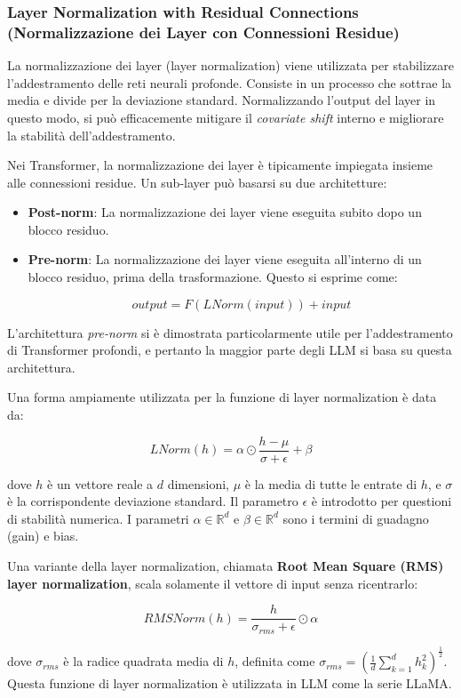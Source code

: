 \subsubsection{Layer Normalization with Residual Connections (Normalizzazione dei Layer con Connessioni Residue)}
La normalizzazione dei layer (layer normalization) viene utilizzata per stabilizzare l'addestramento delle reti neurali profonde. Consiste in un processo che sottrae la media e divide per la deviazione standard. Normalizzando l'output del layer in questo modo, si può efficacemente mitigare il \textit{covariate shift} interno e migliorare la stabilità dell'addestramento.

Nei Transformer, la normalizzazione dei layer è tipicamente impiegata insieme alle connessioni residue. Un sub-layer può basarsi su due architetture:
\begin{itemize}
\item \textbf{Post-norm}: La normalizzazione dei layer viene eseguita subito dopo un blocco residuo.
\item \textbf{Pre-norm}: La normalizzazione dei layer viene eseguita all'interno di un blocco residuo, prima della trasformazione. Questo si esprime come:


$$output = F(LNorm(input)) + input$$


\end{itemize}
L'architettura \textit{pre-norm} si è dimostrata particolarmente utile per l'addestramento di Transformer profondi, e pertanto la maggior parte degli LLM si basa su questa architettura.

Una forma ampiamente utilizzata per la funzione di layer normalization è data da:


$$LNorm(h) = \alpha \odot \frac{h - \mu}{\sigma + \epsilon} + \beta$$


dove $h$ è un vettore reale a $d$ dimensioni, $\mu$ è la media di tutte le entrate di $h$, e $\sigma$ è la corrispondente deviazione standard. Il parametro $\epsilon$ è introdotto per questioni di stabilità numerica. I parametri $\alpha \in \mathbb{R}^d$ e $\beta \in \mathbb{R}^d$ sono i termini di guadagno (gain) e bias.

Una variante della layer normalization, chiamata \textbf{Root Mean Square (RMS) layer normalization}, scala solamente il vettore di input senza ricentrarlo:


$$RMSNorm(h) = \frac{h}{\sigma_{rms} + \epsilon} \odot \alpha$$


dove $\sigma_{rms}$ è la radice quadrata media di $h$, definita come $\sigma_{rms} = \left( \frac{1}{d} \sum_{k=1}^d h_k^2 \right)^{\frac{1}{2}}$. Questa funzione di layer normalization è utilizzata in LLM come la serie LLaMA.

